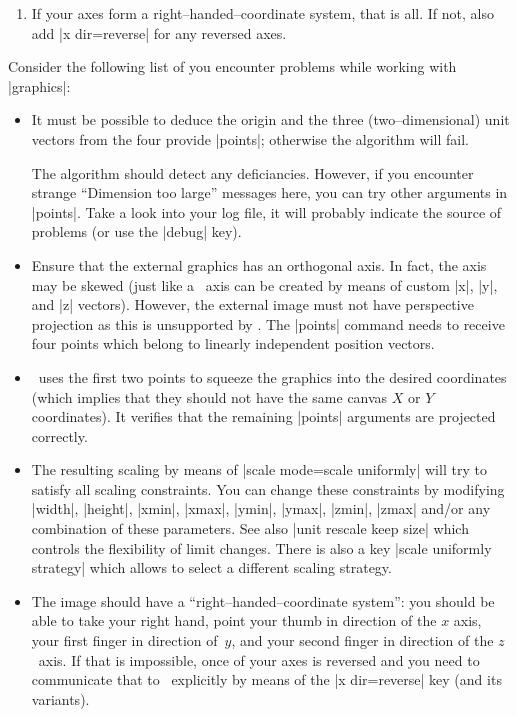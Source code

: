 {{\begin{enumerate}
	\item If your axes form a right--handed--coordinate system, that is all. If not, also add |x dir=reverse| for any reversed axes.
\end{enumerate}

\noindent
Consider the following list of you encounter problems while working with  |graphics|:
\begin{itemize}
	\item It must be possible to deduce the origin and the three (two--dimensional) unit vectors from the four provide |points|; otherwise the algorithm will fail. 
	
	The algorithm should detect any deficiancies. However, if you encounter strange ``Dimension too large'' messages here, you can try other arguments in |points|. Take a look into your log file, it will probably indicate the source of problems (or use the |debug| key).

	\item Ensure that the external graphics has an orthogonal axis. In fact, the axis may be skewed (just like a \PGFPlots\ axis can be created by means of custom |x|, |y|, and |z| vectors). However, the external image must not have perspective projection as this is unsupported by \PGFPlots. The |points| command needs to receive four points which belong to linearly independent position vectors. 

	\item \PGFPlots\ uses the first two points to squeeze the graphics into the desired coordinates (which implies that they should not have the same canvas $X$ or $Y$ coordinates). It verifies that the remaining |points| arguments are projected correctly.
	\item The resulting scaling by means of |scale mode=scale uniformly| will try to satisfy all scaling constraints. You can change these constraints by modifying |width|, |height|, |xmin|, |xmax|, |ymin|, |ymax|, |zmin|, |zmax| and/or any combination of these parameters. See also |unit rescale keep size| which controls the flexibility of limit changes. There is also a key |scale uniformly strategy| which allows to select a different scaling strategy.
	 
	\item The image should have a ``right--handed--coordinate system'': you should be able to take your right hand, point your thumb in direction of the $x$ axis, your first finger in direction of~$y$, and your second finger in direction of the $z$~axis. If that is impossible, once of your axes is reversed and you need to communicate that to \PGFPlots\ explicitly by means of the |x dir=reverse| key (and its variants).


\end{itemize}}}
